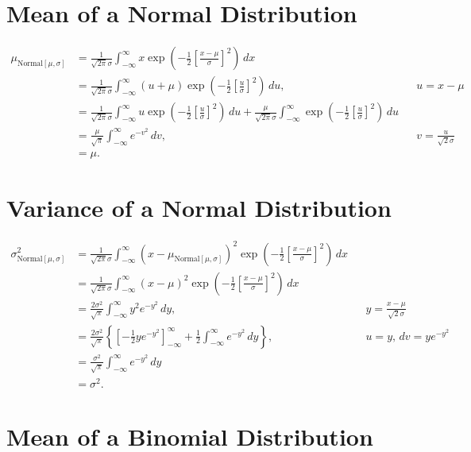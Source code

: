 \documentclass{myart}
\newcommand{\intr}{\int_{-\infty}^\infty}
\newcommand{\du}{\,du}
\newcommand{\dv}{\,dv}
\newcommand{\dx}{\,dx}
\newcommand{\dy}{\,dy}
\newcommand{\mean}{\mu}
\newcommand{\sdev}{\sigma}
\newcommand{\variance}{\sigma^2}
\newcommand{\sub}[1]{_{\text{#1}}}
\begin{document}
\section{Mean of a Normal Distribution}

\begin{align*}
   \mean\sub{Normal$[\mean,\sdev]$}
&= \frac{1}{\sqrt{2\pi} \sdev} \intr x \exp\left(-\frac{1}{2}
     \left[\frac{x - \mean}{\sdev}\right]^2\right) \dx \\
&= \frac{1}{\sqrt{2\pi} \sdev} \intr (u + \mean)
     \exp\left(-\frac{1}{2} \left[
       \frac{u}{\sdev}\right]^2\right) \du, && u = x - \mean \\
&= \frac{1}{\sqrt{2\pi} \sdev} \intr u
     \exp\left(-\frac{1}{2}
     \left[\frac{u}{\sdev}\right]^2\right) \du
     + \frac{\mean}{\sqrt{2\pi} \sdev}
     \intr \exp\left(-\frac{1}{2}
       \left[\frac{u}{\sdev}\right]^2\right) \du \\
&= \frac{\mean}{\sqrt{\pi}} \intr e^{-v^2} \dv,
&& v = \frac{u}{\sqrt{2} \sdev} \\
&= \mu.
\end{align*}

\section{Variance of a Normal Distribution}

\begin{align*}
   \variance\sub{Normal$[\mean,\sdev]$}
&= \frac{1}{\sqrt{2\pi} \sdev}
   \intr (x - \mean\sub{Normal$[\mean,\sdev]$})^2
     \exp\left(-\frac{1}{2} \left[
       \frac{x - \mean}{\sdev}
     \right]^2\right) \dx \\
&= \frac{1}{\sqrt{2\pi} \sdev}
   \intr (x - \mean)^2 \exp\left(-\frac{1}{2} \left[
     \frac{x - \mean}{\sdev}
   \right]^2\right) \dx \\
&= \frac{2\variance}{\sqrt{\pi}}
   \intr y^2 e^{-y^2} \dy,
&& y = \frac{x - \mean}{\sqrt{2} \sdev} \\
&= \frac{2\variance}{\sqrt{\pi}} \left\{
     \left[-\frac{1}{2} y e^{-y^2}\right]_{-\infty}^\infty
   + \frac{1}{2} \intr e^{-y^2} \dy\right\},
&& u = y, \dv = y e^{-y^2} \\
&= \frac{\variance}{\sqrt{\pi}} \intr e^{-y^2} \dy \\
&= \variance.
\end{align*}

\section{Mean of a Binomial Distribution}
\end{document}
